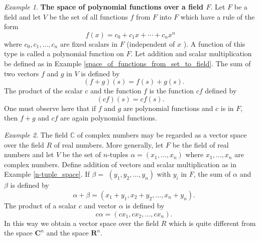 \documentclass{book}
\theoremstyle{remark}
\newtheorem{example}{Example}[section]
\theoremstyle{definition}
\begin{document}
\begin{example}\label{example_4}
\textbf{The space of polynomial functions over a field $F$}. Let $F$ be a field and let $V$ be the set of all functions $f$ from $F$ into $F$ which have a rule of the form
$$
f(x)=c_0+c_1 x+\cdots+c_n x^n
$$
where $c_0, c_1, \ldots, c_n$ are fixed scalars in $F$ (independent of $x$ ). A function of this type is called a polynomial function on $F$. Let addition and scalar multiplication be defined as in Example \ref{space_of_functions_from_set_to_field}. The sum of two vectors $f$ and $g$ in $V$ is defined by
$$\quad(f+g)(s)=f(s)+g(s).$$
The product of the scalar $c$ and the function $f$ is the function $c f$ defined by
$$
(c f)(s)=c f(s) .
$$
One must observe here that if $f$ and $g$ are polynomial functions and $c$ is in $F$, then $f+g$ and $c f$ are again polynomial functions.
\end{example}

\begin{example}
The field $\mathbb{C}$ of complex numbers may be regarded as a vector space over the field $R$ of real numbers. More generally, let $F$ be the field of real numbers and let $V$ be the set of $n$-tuples $\alpha=\left(x_1, \ldots, x_n\right)$ where $x_1, \ldots, x_n$ are complex numbers. Define addition of vectors and scalar multiplication as in Example \ref{n-tuple_space}. If $\beta=$ $\left(y_1, y_2, \ldots, y_n\right)$ with $y_i$ in $F$, the sum of $\alpha$ and $\beta$ is defined by
$$\quad \alpha+\beta=\left(x_1+y_1, x_2+y_2, \ldots, x_n+y_n\right).$$
The product of a scalar $c$ and vector $\alpha$ is defined by
$$\quad c \alpha=\left(c x_1, c x_2, \ldots, c x_n\right).$$ In this way we obtain a vector space over the field $R$ which is quite different from the space $\mathbf{C}^n$ and the space $\mathbf{R}^n$.
\end{example}
\end{document}
